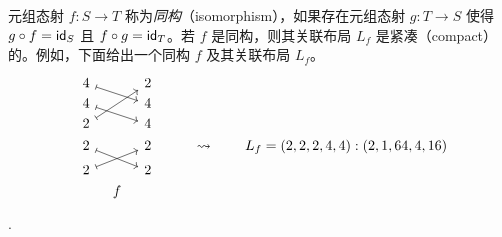 \begin{example}[同构]
元组态射 $f:S \to T$ 称为{\it 同构}（isomorphism），如果存在元组态射 $g:T \to S$ 使得 $g \circ f = \mathsf{id}_S$ 且 $f \circ g = \mathsf{id}_T$。若 $f$ 是同构，则其关联布局 $L_f$ 是紧凑（compact）的。例如，下面给出一个同构 $f$ 及其关联布局 $L_f$。
    \[
    \begin{tikzcd}[row sep = 1, column sep = 8]
    & 4 \ar[rrd,mapsto] & & 2 & & & & & \\
    & 4 \ar[rrd,mapsto] & & 4 & & & & &  \\
    & 2 \ar[rruu, mapsto] & & 4 & & & & & \\
    & 2 \ar[rrd,mapsto] & & 2 & & & \rightsquigarrow & & L_f = (2,2,2,4,4):(2,1,64,4,16)\\
    & 2 \ar[rru,mapsto] & & 2 & & & & & \\
    & & f & & & & & & \\
    \end{tikzcd}
\].
\end{example}


